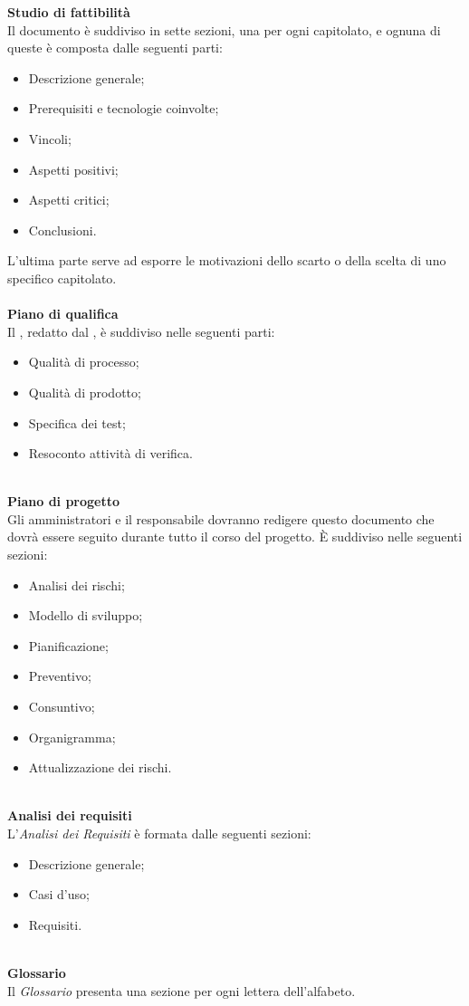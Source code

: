 \mbox{}

\textbf{Studio di fattibilità}\\
Il documento è suddiviso in sette sezioni, una per ogni capitolato, e ognuna di queste è composta dalle seguenti parti:
\begin{itemize}
    \item Descrizione generale;
    \item Prerequisiti e tecnologie coinvolte;
    \item Vincoli;
    \item Aspetti positivi;
    \item Aspetti critici;
    \item Conclusioni.
\end{itemize}
L'ultima parte serve ad esporre le motivazioni dello scarto o della scelta di uno specifico capitolato.\\ \mbox{} \\
\textbf{Piano di qualifica}  \\
Il \PdQ{}, redatto dal , è suddiviso nelle seguenti parti:
\begin{itemize}
\item Qualità di processo;
\item Qualità di prodotto;
\item Specifica dei test;
\item Resoconto attività di verifica.
\end{itemize} 
\mbox{} \\
\textbf{Piano di progetto} \\
Gli amministratori e il responsabile dovranno redigere questo documento che dovrà essere seguito durante tutto il corso del progetto. È suddiviso nelle seguenti sezioni:
\begin{itemize}
    \item Analisi dei rischi;
    \item Modello di sviluppo;
    \item Pianificazione;  
    \item Preventivo;
    \item Consuntivo;
    \item Organigramma;
    \item Attualizzazione dei rischi. 
\end{itemize}
\mbox{} \\
\textbf{Analisi dei requisiti}\\
L'\textit{Analisi dei Requisiti} è formata dalle seguenti sezioni:
\begin{itemize}
	\item Descrizione generale;
	\item Casi d'uso;
	\item Requisiti.
\end{itemize}
\mbox{} \\
\textbf{Glossario}\\
Il \textit{Glossario} presenta una sezione per ogni lettera dell'alfabeto. 

